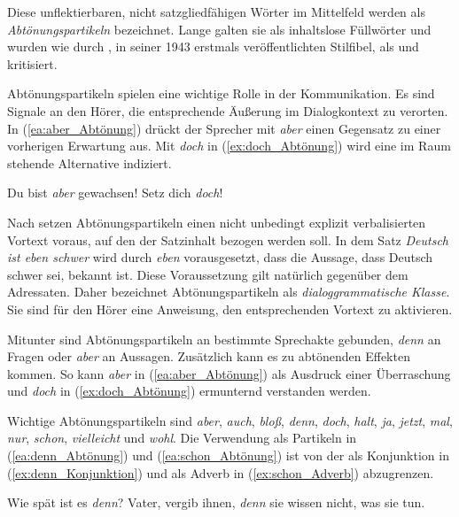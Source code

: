 Diese unflektierbaren, nicht satzgliedfähigen Wörter im Mittelfeld werden als \textit{Abtönungspartikeln} bezeichnet. Lange galten sie als inhaltslose Füllwörter und wurden wie durch \citet[241--242]{Reiners1943_2004}, in seiner 1943 erstmals veröffentlichten Stilfibel, als  und  kritisiert.

Abtönungspartikeln spielen eine wichtige Rolle in der Kommunikation. Es sind Signale an den Hörer, die entsprechende Äußerung im Dialogkontext zu verorten. In (\ref{ea:aber_Abtönung}) drückt der Sprecher mit \textit{aber} einen Gegensatz zu einer vorherigen Erwartung aus. Mit \textit{doch} in (\ref{ex:doch_Abtönung}) wird eine im Raum stehende Alternative indiziert.

\ea \label{ea:Abtönung}
\ea \label{ea:aber_Abtönung} Du bist \textit{aber} gewachsen!
\ex \label{ex:doch_Abtönung} Setz dich \textit{doch}!
\z 
\z 

Nach \citet[129]{Diewald2009} setzen Abtönungspartikeln einen nicht unbedingt explizit verbalisierten Vortext voraus, auf den der Satzinhalt bezogen werden soll. In dem Satz \textit{Deutsch ist eben schwer} wird durch \textit{eben} vorausgesetzt, dass die Aussage, dass Deutsch schwer sei, bekannt ist. Diese Voraussetzung gilt natürlich gegenüber dem Adressaten. Daher bezeichnet \citet[129]{Diewald2009} Abtönungspartikeln als \textit{dialoggrammatische Klasse}. Sie sind für den Hörer eine Anweisung, den entsprechenden Vortext zu aktivieren. 

Mitunter sind Abtönungspartikeln an bestimmte Sprechakte gebunden, \zB \textit{denn} an Fragen oder \textit{aber} an Aussagen. Zusätzlich kann es zu abtönenden Effekten kommen. So kann \textit{aber} in (\ref{ea:aber_Abtönung}) als Ausdruck einer Überraschung und \textit{doch} in (\ref{ex:doch_Abtönung}) ermunternd verstanden werden.

Wichtige Abtönungspartikeln sind \textit{aber}, \textit{auch}, \textit{bloß}, \textit{denn}, \textit{doch}, \textit{halt}, \textit{ja}, \textit{jetzt}, \textit{mal}, \textit{nur}, \textit{schon}, \textit{vielleicht} und \textit{wohl}. Die Verwendung als Partikeln in (\ref{ea:denn_Abtönung}) und (\ref{ea:schon_Abtönung}) ist von der als Konjunktion in (\ref{ex:denn_Konjunktion}) und als Adverb in (\ref{ex:schon_Adverb}) abzugrenzen.

\ea \label{ea:denn_Partikel_Konj}
\ea \label{ea:denn_Abtönung} Wie spät ist es \textit{denn}?
\ex \label{ex:denn_Konjunktion} Vater, vergib ihnen, \textit{denn} sie wissen nicht, was sie tun.
\z 
\z 


